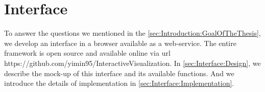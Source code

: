 
\chapter{Interface}
\label{ch:Interface}
To answer the questions we mentioned in the \autoref{sec:Introduction:GoalOfTheThesis}, we develop an interface in a browser available as a web-service. The entire framework is open source and available online via url https://github.com/yimin95/InteractiveVisualization. In \autoref{sec:Interface:Design}, we describe the mock-up of this interface and its available functions. And we introduce the details of implementation in \autoref{sec:Interface:Implementation}.\\

